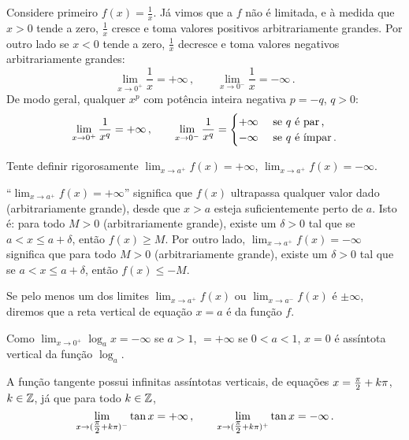\begin{ex}
Considere primeiro $f(x)=\frac{1}{x}$. Já vimos que a $f$ não é
limitada, e à medida que $x>0$ tende a zero,
$\frac{1}{x}$ cresce e toma valores positivos arbitrariamente grandes.
Por outro lado se $x<0$ tende a zero, $\frac{1}{x}$ decresce e toma
valores negativos arbitrariamente grandes:
$$
\lim_{x\to 0^+}\frac{1}{x}=+\infty\,,\quad\quad \lim_{x\to
0^-}\frac{1}{x}=-\infty\,.
$$ 
De modo geral, qualquer $x^p$ com potência inteira negativa
$p=-q$, $q>0$:
$$
\lim_{x\to 0^+}\frac{1}{x^q}=+\infty\,,\quad\quad
\lim_{x\to 0^-}\frac{1}{x^q}=
\begin{cases}
+\infty&\text{ se $q$ é par\,,}\\
-\infty&\text{ se $q$ é ímpar\,.}
\end{cases}
$$
\end{ex}

\begin{exo}
Tente definir 
rigorosamente $\lim_{x\to a^+}f(x)=+\infty$, $\lim_{x\to a^+}f(x)=-\infty$.
\begin{sol}
``$\lim_{x\to a^+}f(x)=+\infty$'' significa que $f(x)$ ultrapassa
qualquer valor dado (arbitrariamente grande), desde que $x>a$ esteja
suficientemente perto de $a$. Isto é: para todo $M>0$ (arbitrariamente
grande), existe um $\delta>0$ tal que se $a<x\leq a+\delta$, então
$f(x)\geq M$.
Por outro lado, $\lim_{x\to a^+}f(x)=-\infty$ significa que 
para todo $M>0$ (arbitrariamente grande), 
existe um $\delta>0$ tal que se $a<x\leq a+\delta$, então $f(x)\leq
-M$.
\end{sol}
\end{exo}

\begin{defin}
 Se pelo menos um dos limites $\lim_{x\to a^+}f(x)$ ou $\lim_{x\to
a^-}f(x)$ é $\pm \infty$, diremos que a reta vertical de equação
$x=a$ é  da função $f$.
\end{defin}

\begin{ex} Como $\lim_{x\to 0^+}\log_ax=-\infty$ se $a>1$, $=+\infty$
se $0<a<1$, $x=0$ é assíntota vertical da função $\log_a$.
\end{ex}

\begin{ex}
A função tangente possui infinitas assíntotas verticais, 
de equações $x=\tfrac{\pi}{2}+k\pi$, $k\in \mathbb{Z}$, 
já que para todo $k\in \mathbb{Z}$,
$$
\lim_{x\to (\tfrac{\pi}{2}+k\pi)^-}\tan x=+\infty\,,\quad\quad
\lim_{x\to (\tfrac{\pi}{2}+k\pi)^+}\tan x=-\infty\,.
$$
\end{ex}

